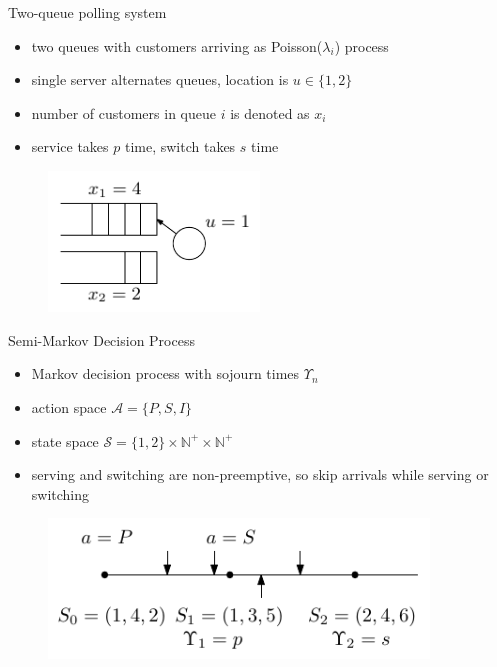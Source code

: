 \documentclass[bigger]{beamer}
\begin{document}
\begin{frame}[label={sec:org031a230}]{Two-queue polling system}
\begin{itemize}
\item two queues with customers arriving as Poisson(\(\lambda_i\)) process
\item single server alternates queues, location is \(u \in \{1,2\}\)
\item number of customers in queue \(i\) is denoted as \(x_i\)
\item service takes \(p\) time, switch takes \(s\) time
\end{itemize}

\vfill
\begin{figure}
  \centering
  \includegraphics[width=0.5\textwidth]{../figures/polling.pdf}
\end{figure}
\end{frame}
\begin{frame}[label={sec:orgf5209bb}]{Semi-Markov Decision Process}
\begin{itemize}
\item Markov decision process with sojourn times \(\Upsilon_n\)
\item action space \(\mathcal{A} = \{P,S,I\}\)
\item state space \(\mathcal{S} = \{1,2\} \times \mathbb{N}^+ \times \mathbb{N}^+\)
\item serving and switching are non-preemptive, so skip arrivals while serving or switching
\end{itemize}

\vfill
\begin{figure}
  \centering
  \includegraphics[width=0.9\textwidth]{../figures/polling_smdp.pdf}
\end{figure}
\end{frame}
\end{document}
